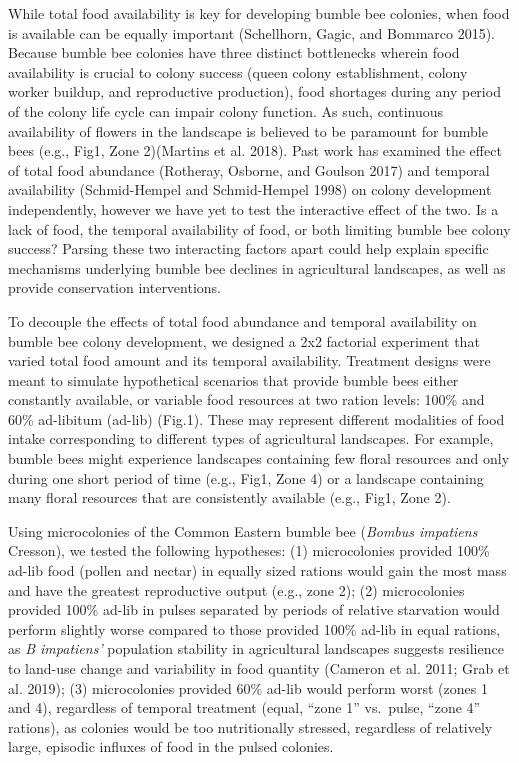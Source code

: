 \documentclass[11pt,]{article}
\begin{document}
While total food availability is key for developing bumble bee colonies,
when food is available can be equally important (Schellhorn, Gagic, and
Bommarco 2015). Because bumble bee colonies have three distinct
bottlenecks wherein food availability is crucial to colony success
(queen colony establishment, colony worker buildup, and reproductive
production), food shortages during any period of the colony life cycle
can impair colony function. As such, continuous availability of flowers
in the landscape is believed to be paramount for bumble bees (e.g.,
Fig1, Zone 2)(Martins et al. 2018). Past work has examined the effect of
total food abundance (Rotheray, Osborne, and Goulson 2017) and temporal
availability (Schmid-Hempel and Schmid-Hempel 1998) on colony
development independently, however we have yet to test the interactive
effect of the two. Is a lack of food, the temporal availability of food,
or both limiting bumble bee colony success? Parsing these two
interacting factors apart could help explain specific mechanisms
underlying bumble bee declines in agricultural landscapes, as well as
provide conservation interventions.

To decouple the effects of total food abundance and temporal
availability on bumble bee colony development, we designed a 2x2
factorial experiment that varied total food amount and its temporal
availability. Treatment designs were meant to simulate hypothetical
scenarios that provide bumble bees either constantly available, or
variable food resources at two ration levels: 100\% and 60\% ad-libitum
(ad-lib) (Fig.1). These may represent different modalities of food
intake corresponding to different types of agricultural landscapes. For
example, bumble bees might experience landscapes containing few floral
resources and only during one short period of time (e.g., Fig1, Zone 4)
or a landscape containing many floral resources that are consistently
available (e.g., Fig1, Zone 2).

Using microcolonies of the Common Eastern bumble bee (\emph{Bombus
impatiens} Cresson), we tested the following hypotheses: (1)
microcolonies provided 100\% ad-lib food (pollen and nectar) in equally
sized rations would gain the most mass and have the greatest
reproductive output (e.g., zone 2); (2) microcolonies provided 100\%
ad-lib in pulses separated by periods of relative starvation would
perform slightly worse compared to those provided 100\% ad-lib in equal
rations, as \emph{B impatiens'} population stability in agricultural
landscapes suggests resilience to land-use change and variability in
food quantity (Cameron et al. 2011; Grab et al. 2019); (3) microcolonies
provided 60\% ad-lib would perform worst (zones 1 and 4), regardless of
temporal treatment (equal, ``zone 1'' vs.~pulse, ``zone 4'' rations), as
colonies would be too nutritionally stressed, regardless of relatively
large, episodic influxes of food in the pulsed colonies.
\end{document}
